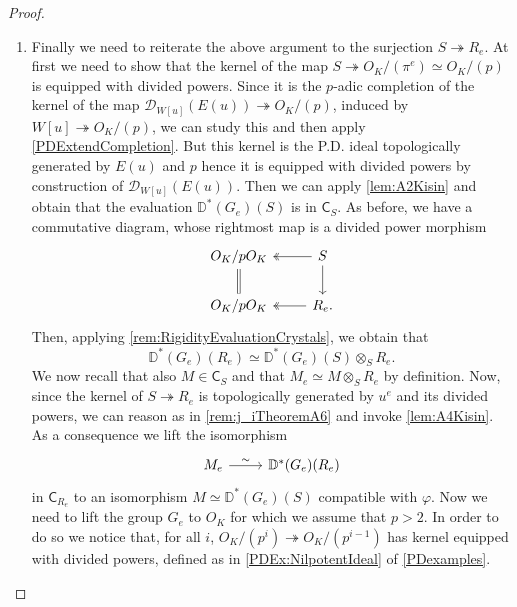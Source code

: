 \begin{proof}
\begin{enumerate}
\item Finally we need to reiterate the above argument to the surjection
	$S \twoheadrightarrow R_e$.
	At first we need to show that the kernel of the map 
	\(S \twoheadrightarrow O_K/ (\pi^e) \simeq O_K/ (p)\) is equipped with divided powers.
	Since it is the $p$-adic completion of the kernel
	of the map $\mathcal{D}_{W[u]}(E(u)) \twoheadrightarrow O_K/ (p)$,
	induced by $W[u] \twoheadrightarrow O_K/ (p)$, we can study this and
	then apply \cref{PDExtendCompletion}.
	But this kernel is the P.D. ideal topologically generated 
	by $E(u)$ and $p$ hence it is equipped with divided powers by
	construction of $\mathcal{D}_{W[u]}(E(u))$.
	Then we can apply \cref{lem:A2Kisin} and obtain that the evaluation
	$\mathbb{D}^*(G_e)(S)$ is in $\mathsf{C}_{S}$.
	As before, we have a commutative diagram,
	whose rightmost map is a divided power morphism
	\begin{equation*}
	\begin{tikzcd}
		O_K/ pO_K \arrow[d, "", equal] &
		S \arrow[l, "", twoheadrightarrow] 
		\arrow[d, "", rightarrow] \\
		O_K/ p O_K &
		R_{ e } \arrow[l, "", twoheadrightarrow] 
	.\end{tikzcd}
	\end{equation*}
	Then, applying \cref{rem:RigidityEvaluationCrystals}, we obtain that
	\begin{equation*}
		\mathbb{D}^*(G_{ e })(R_{ e }) \simeq
		\mathbb{D}^*(G_{ e })(S) \otimes_{ S } R_{ e }
	.\end{equation*}
	We now recall that also $M \in \mathsf{C}_{S}$ and
	that \(M_{ e } \simeq M \otimes_{ S } R_{ e }\) by definition.
	Now, since the kernel of \(S \twoheadrightarrow R_e\) is
	topologically generated by \(u^e\) and its divided powers,
	we can reason as in \cref{rem:j_iTheoremA6}
	and invoke \cref{lem:A4Kisin}.
	As a consequence we lift the isomorphism 
	\begin{equation*}
	\begin{tikzcd}
		M_e \arrow[r, "\sim", rightarrow] &
		\mathbb{D}^*(G_e)(R_e)
	\end{tikzcd}
	\end{equation*}
	in $\mathsf{C}_{R_e}$ to an isomorphism $M \simeq \mathbb{D}^*(G_e)(S)$
	compatible with $\varphi$.
	Now we need to lift the group $G_e$ to $O_K$ for which we assume that $p > 2$.
	In order to do so we notice that, for all $i$,
	$O_K/ (p^{i}) \twoheadrightarrow O_K/ (p^{ i-1 })$ has kernel equipped with
	divided powers, defined as in \cref{PDEx:NilpotentIdeal} of \cref{PDexamples}. 

\end{enumerate}
\end{proof}
